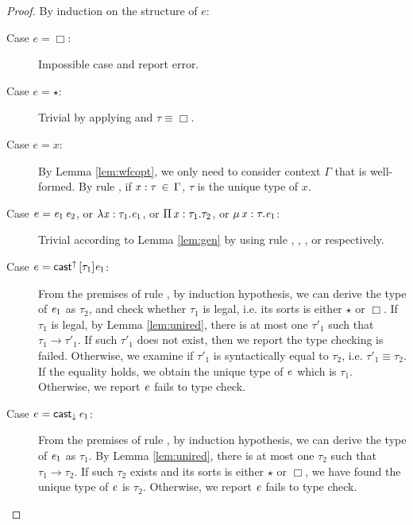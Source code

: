\begin{proof}
	By induction on the structure of $e$:
	\begin{description}
	    \item[Case $e= \Box $:] Impossible case and report error.
	    \item[Case $e= \star $:] Trivial by applying  and $\tau  \equiv  \Box$.
		\item[Case $e=x$:] By Lemma \ref{lem:wfcopt}, we only need to consider context $\Gamma$ that is well-formed. By rule , if $\mathit{x}  :  \tau \, \in \, \Gamma$, $\tau$ is the unique type of $x$.
		\item[Case $e=\mathit{e_{{\mathrm{1}}}} \, \mathit{e_{{\mathrm{2}}}}$, or $\lambda  \mathit{x}  :  \tau_{{\mathrm{1}}}  .  \mathit{e_{{\mathrm{1}}}}$, or $\Pi \, \mathit{x}  :  \tau_{{\mathrm{1}}}  .  \tau_{{\mathrm{2}}}$, or $\mu \, \mathit{x}  :  \tau  .  \mathit{e_{{\mathrm{1}}}}$:] Trivial according to Lemma \ref{lem:gen} by using rule , , , or  respectively.
		\item[Case $e=\mathsf{cast}^{\uparrow} \, [  \tau_{{\mathrm{1}}}  ]  \mathit{e_{{\mathrm{1}}}}$:] From the premises of rule , by induction hypothesis, we can derive the type of $\mathit{e_{{\mathrm{1}}}}$ as $\tau_{{\mathrm{2}}}$, and check whether $\tau_{{\mathrm{1}}}$ is legal, i.e. its sorts is either $ \star $ or $ \Box $. If $\tau_{{\mathrm{1}}}$ is legal, by Lemma \ref{lem:unired}, there is at most one $\tau'_{{\mathrm{1}}}$ such that $\tau_{{\mathrm{1}}}  \longrightarrow  \tau'_{{\mathrm{1}}}$. If such $\tau'_{{\mathrm{1}}}$ does not exist, then we report the type checking is failed. Otherwise, we examine if $\tau'_{{\mathrm{1}}}$ is syntactically equal to $\tau_{{\mathrm{2}}}$, i.e. $\tau'_{{\mathrm{1}}}  \equiv  \tau_{{\mathrm{2}}}$. If the equality holds, we obtain the unique type of $\mathit{e}$ which is $\tau_{{\mathrm{1}}}$. Otherwise, we report $\mathit{e}$ fails to type check.
		\item[Case $e=\mathsf{cast}_{\downarrow} \, \mathit{e_{{\mathrm{1}}}}$:] From the premises of rule , by induction hypothesis, we can derive the type of $\mathit{e_{{\mathrm{1}}}}$ as $\tau_{{\mathrm{1}}}$. By Lemma \ref{lem:unired}, there is at most one $\tau_{{\mathrm{2}}}$ such that $\tau_{{\mathrm{1}}}  \longrightarrow  \tau_{{\mathrm{2}}}$. If such $\tau_{{\mathrm{2}}}$ exists and its sorts is either $ \star $ or $ \Box $, we have found the unique type of $\mathit{e}$ is $\tau_{{\mathrm{2}}}$. Otherwise, we report $\mathit{e}$ fails to type check.
	\end{description}
\end{proof}

